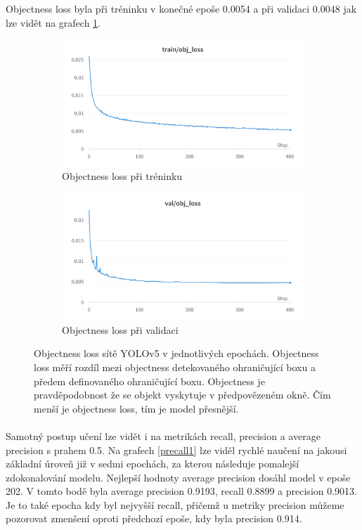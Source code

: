 Objectness loss byla při tréninku v konečné epoše 0.0054 a při validaci 0.0048 jak lze vidět na grafech \ref{obj1}. 

\begin{figure}[h]\centering
    \centering
    \begin{subfigure}{0.7\textwidth}
    \includegraphics[width=0.95\linewidth]{obrazky-figures/train_obj1.png}\hfill
    \caption{Objectness loss při tréninku}
    \end{subfigure}
    \begin{subfigure}{0.7\textwidth}
    \includegraphics[width=0.95\linewidth]{obrazky-figures/obj_val1.png}\hfill
    \caption{Objectness loss při validaci}
    \end{subfigure}
    \caption{Objectness loss sítě YOLOv5 v jednotlivých epochách. Objectness loss měří rozdíl mezi objectness detekovaného ohraničující boxu a předem definovaného ohraničující boxu. Objectness je pravděpodobnost že se objekt vyskytuje v předpovězeném okně. Čím menší je objectness loss, tím je model přesnější.}
    \label{obj1}
\end{figure}

\paragraph{} Samotný postup učení lze vidět i na metrikách recall, precision a average precision s prahem 0.5. Na grafech \ref{precall1} lze viděl rychlé naučení na jakousi základní úroveň již v sedmi epochách, za kterou následuje pomalejší zdokonalování modelu. Nejlepší hodnoty average precision dosáhl model v epoše 202. V tomto bodě byla average precision 0.9193, recall 0.8899 a precision 0.9013. Je to také epocha kdy byl nejvyšší recall, přičemž u metriky precision můžeme pozorovat zmenšení oproti předchozí epoše, kdy byla precision 0.914.
\pagebreak

